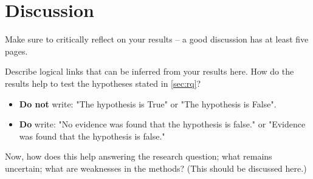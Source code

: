 \chapter{Discussion}
\label{ch:discussion}

Make sure to critically reflect on your results -- a good discussion has at least five pages.

Describe logical links that can be inferred from your results here. How do the results help to test the hypotheses stated in \autoref{sec:rq}?\vspace{1em}

\begin{itemize}
	\item \textbf{Do not} write: "The hypothesis is True" or "The hypothesis is False".
	\item \textbf{Do} write: "No evidence was found that the hypothesis is false." or "Evidence was found that the hypothesis is false."
\end{itemize}
\vspace{1em}
Now, how does this help answering the research question; what remains uncertain; what are weaknesses in the methods? (This should be discussed here.)
\vspace{1em}
